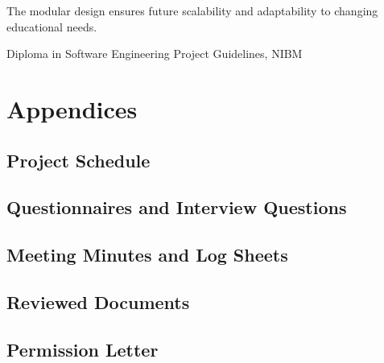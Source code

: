 \documentclass[12pt,a4paper]{report}
\begin{document}
The modular design ensures future scalability and adaptability to changing educational needs.

\newpage
\begin{thebibliography}{9}
     Diploma in Software Engineering Project Guidelines, NIBM
\end{thebibliography}

\appendix
\chapter{Appendices}
\section{Project Schedule}

\section{Questionnaires and Interview Questions}

\section{Meeting Minutes and Log Sheets}

\section{Reviewed Documents}

\section{Permission Letter}
\end{document}
